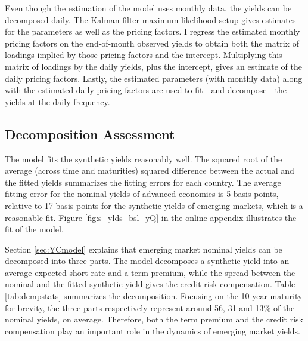 \documentclass[a4paper, 12pt]{article}
\begin{document}
Even though the estimation of the model uses monthly data, the yields can be decomposed daily. The Kalman filter maximum likelihood setup gives estimates for the parameters as well as the pricing factors. I regress the estimated monthly pricing factors on the end-of-month observed yields to obtain both the matrix of loadings implied by those pricing factors and the intercept. Multiplying this matrix of loadings by the daily yields, plus the intercept, gives an estimate of the daily pricing factors. Lastly, the estimated parameters (with monthly data) along with the estimated daily pricing factors are used to fit---and decompose---the yields at the daily frequency. 

\subsection{Decomposition Assessment} \label{sec:modelfit}
The model fits the synthetic yields reasonably well. The squared root of the average (across time and maturities) squared difference between the actual and the fitted yields summarizes the fitting errors for each country. The average fitting error for the nominal yields of advanced economies is 5 basis points, relative to 17 basis points for the synthetic yields of emerging markets, which is a reasonable fit. Figure \ref{fig:s_ylds_bsl_yQ} in the online appendix illustrates the fit of the model. 

Section \ref{sec:YCmodel} explains that emerging market nominal yields can be decomposed into three parts. The model decomposes a synthetic yield into an average expected short rate and a term premium, while the spread between the nominal and the fitted synthetic yield gives the credit risk compensation. Table \ref{tab:dcmpstats} summarizes the decomposition. Focusing on the 10-year maturity for brevity, the three parts respectively represent around 56, 31 and 13\% of the nominal yields, on average. Therefore, both the term premium and the credit risk compensation play an important role in the dynamics of emerging market yields. 
\end{document}
